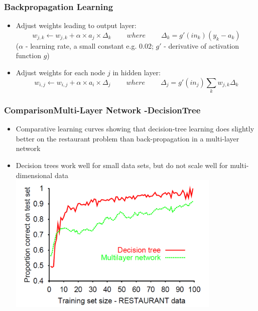 \documentclass[conference, a4paper]{styles/acmsiggraph}
\begin{document}
        \subsubsection{Backpropagation Learning}
            \begin{itemize}
                \item Adjust weights leading to output layer:
                $$w_{j,k} \leftarrow w_{j,k} + \alpha \times a_j \times \Delta_k\ \ \ \ \ \ \ \ \ \ where\ \ \ \ \ \ \ \ \ \ \Delta_k = g'(in_k)(y_k - a_k)$$
                ($\alpha$ - learning rate, a small constant e.g. 0.02; $g'$ - derivative of activation function $g$)
                \item Adjust weights for each node $j$ in hidden layer:
                $$w_{i,j} \leftarrow w_{i,j} + \alpha \times a_i \times \Delta_j\ \ \ \ \ \ \ \ \ \ where\ \ \ \ \ \ \ \ \ \ \Delta_j = g'(in_j) \sum\limits_{k} w_{j,k} \Delta_k$$
            \end{itemize}
        
        
    
    
    
        \subsubsection{ComparisonMulti-Layer Network -DecisionTree}
            \begin{itemize}
                \item Comparative learning curves showing that decision-tree learning does slightly better on the restaurant problem than back-propagation in a multi-layer network
                \item Decision trees work well for small data sets, but do not scale well for multi-dimensional data\newline
                \includegraphics[width=0.8\textwidth]{imgs/ComparisonMultiLayerNetwork.png}
            \end{itemize}
        
\end{document}
